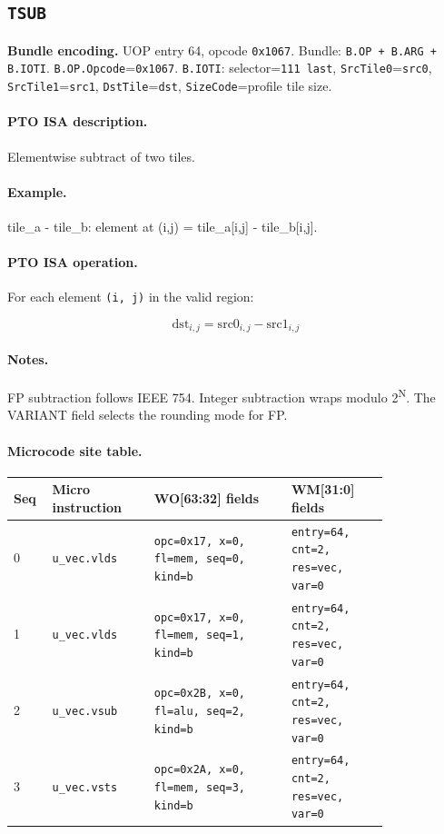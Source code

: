 \subsection{\texttt{TSUB}}
\noindent\textbf{Bundle encoding.} UOP entry 64, opcode \texttt{0x1067}. Bundle: \texttt{B.OP + B.ARG + B.IOTI}. \texttt{B.OP.Opcode}=\texttt{0x1067}. \texttt{B.IOTI}: selector=\texttt{111 last}, \texttt{SrcTile0}=\texttt{src0}, \texttt{SrcTile1}=\texttt{src1}, \texttt{DstTile}=\texttt{dst}, \texttt{SizeCode}=profile tile size.\par\smallskip
{\small
\paragraph{PTO ISA description.}
Elementwise subtract of two tiles.
\paragraph{Example.}
tile\_a - tile\_b: element at (i,j) = tile\_a[i,j] - tile\_b[i,j].
\par\smallskip
\paragraph{PTO ISA operation.}
For each element \texttt{(i, j)} in the valid region:

\[
\mathrm{dst}_{i,j} = \mathrm{src0}_{i,j} - \mathrm{src1}_{i,j}
\]
}\par\smallskip
\paragraph{Notes.}
FP subtraction follows IEEE 754. Integer subtraction wraps modulo 2\textsuperscript{N}. The VARIANT field selects the rounding mode for FP.
\paragraph{Microcode site table.}
{\scriptsize
\begin{longtable}{@{}R{0.055\linewidth}L{0.23\linewidth}L{0.31\linewidth}L{0.22\linewidth}@{}}
\toprule
Seq & Micro instruction & WO[63:32] fields & WM[31:0] fields \\
 & \texttt{u\_vec.vlds} & \texttt{opc=0x17, x=0, fl=mem, seq=0, kind=b} & \texttt{entry=64, cnt=2, res=vec, var=0} \\
1 & \texttt{u\_vec.vlds} & \texttt{opc=0x17, x=0, fl=mem, seq=1, kind=b} & \texttt{entry=64, cnt=2, res=vec, var=0} \\
2 & \texttt{u\_vec.vsub} & \texttt{opc=0x2B, x=0, fl=alu, seq=2, kind=b} & \texttt{entry=64, cnt=2, res=vec, var=0} \\
3 & \texttt{u\_vec.vsts} & \texttt{opc=0x2A, x=0, fl=mem, seq=3, kind=b} & \texttt{entry=64, cnt=2, res=vec, var=0} \\
\bottomrule
\end{longtable}
}
